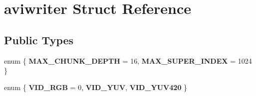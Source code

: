 \hypertarget{structaviwriter}{}\section{aviwriter Struct Reference}
\label{structaviwriter}
\subsection*{Public Types}
\begin{DoxyCompactItemize}
\item 
\mbox{\label{structaviwriter_af2f5c4eaf5ccf66abfeda8146f637b5f}} 
enum \{ {\bfseries M\+A\+X\+\_\+\+C\+H\+U\+N\+K\+\_\+\+D\+E\+P\+TH} = 16, 
{\bfseries M\+A\+X\+\_\+\+S\+U\+P\+E\+R\+\_\+\+I\+N\+D\+EX} = 1024
 \}
\item 
\mbox{\label{structaviwriter_a5db8c15db09f6c7231a1231bb8245e09}} 
enum \{ {\bfseries V\+I\+D\+\_\+\+R\+GB} = 0, 
{\bfseries V\+I\+D\+\_\+\+Y\+UV}, 
{\bfseries V\+I\+D\+\_\+\+Y\+U\+V420}
 \}
\end{DoxyCompactItemize}
